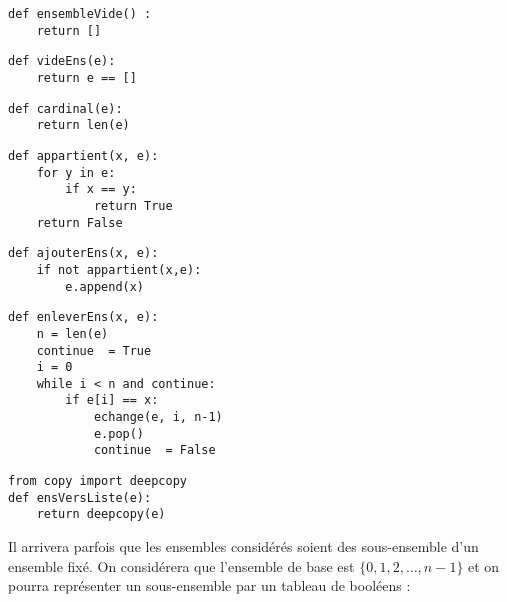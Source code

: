 \begin{Answer}
\begin{lstlisting}
def ensembleVide() :
    return []
\end{lstlisting}

\begin{lstlisting}
def videEns(e):
    return e == []
\end{lstlisting}

\begin{lstlisting}
def cardinal(e):
    return len(e)
\end{lstlisting}

\begin{lstlisting}
def appartient(x, e):
    for y in e:
        if x == y:
            return True
    return False
\end{lstlisting}

\begin{lstlisting}
def ajouterEns(x, e):
    if not appartient(x,e):
        e.append(x)
\end{lstlisting}

\begin{lstlisting}
def enleverEns(x, e):
    n = len(e)
    continue  = True
    i = 0
    while i < n and continue:
        if e[i] == x:
            echange(e, i, n-1)
            e.pop()
            continue  = False
\end{lstlisting}

\begin{lstlisting}
from copy import deepcopy
def ensVersListe(e):
    return deepcopy(e)
\end{lstlisting}
\end{Answer}

\medskip

Il arrivera parfois que les ensembles considérés soient des sous-ensemble d'un ensemble fixé.
On considérera que l'ensemble de base est $\{0,1,2,\ldots,n-1\}$ et on pourra représenter un sous-ensemble par un tableau de booléens : 

